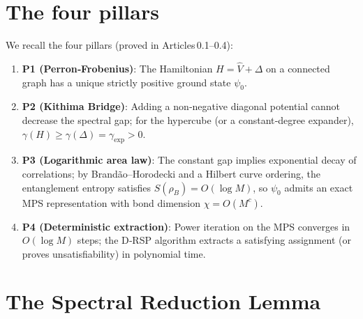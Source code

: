 \documentclass[11pt,a4paper]{article}
\begin{document}
\section{The four pillars}

We recall the four pillars (proved in Articles 0.1–0.4):

\begin{enumerate}
\item \textbf{P1 (Perron‑Frobenius)}: The Hamiltonian \(H = \hat{V} + \Delta\) on a connected graph has a unique strictly positive ground state \(\psi_0\).
\item \textbf{P2 (Kithima Bridge)}: Adding a non‑negative diagonal potential cannot decrease the spectral gap; for the hypercube (or a constant‑degree expander), \(\gamma(H) \ge \gamma(\Delta) = \gamma_{\mathrm{exp}} > 0\).
\item \textbf{P3 (Logarithmic area law)}: The constant gap implies exponential decay of correlations; by Brandão–Horodecki and a Hilbert curve ordering, the entanglement entropy satisfies \(S(\rho_B) = O(\log M)\), so \(\psi_0\) admits an exact MPS representation with bond dimension \(\chi = O(M^c)\).
\item \textbf{P4 (Deterministic extraction)}: Power iteration on the MPS converges in \(O(\log M)\) steps; the D‑RSP algorithm extracts a satisfying assignment (or proves unsatisfiability) in polynomial time.
\end{enumerate}

\section{The Spectral Reduction Lemma}
\end{document}
